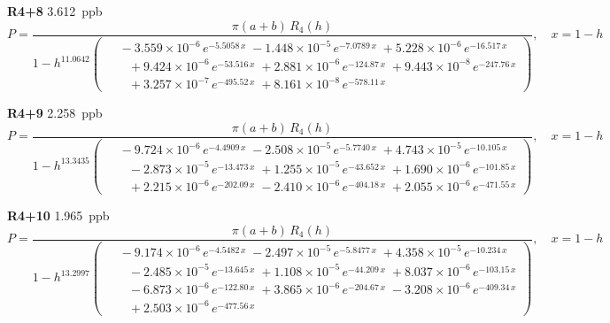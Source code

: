 \documentclass[12pt]{article}
\begin{document}
\noindent\textbf{R4+8} 3.612~ppb\nopagebreak
\begin{equation*}
P = \frac{\pi(a{+}b)\,R_4(h)}{1 - h^{11.0642}\!\left(\!\begin{aligned}
  &\; -3.559{\times}10^{-6}\,e^{-5.5058\,x} \; -1.448{\times}10^{-5}\,e^{-7.0789\,x} \; +5.228{\times}10^{-6}\,e^{-16.517\,x} \\[-3pt]
  &\quad +9.424{\times}10^{-6}\,e^{-53.516\,x} \; +2.881{\times}10^{-6}\,e^{-124.87\,x} \; +9.443{\times}10^{-8}\,e^{-247.76\,x} \\[-3pt]
  &\quad +3.257{\times}10^{-7}\,e^{-495.52\,x} \; +8.161{\times}10^{-8}\,e^{-578.11\,x}
\end{aligned}\!\right)}, \quad x = 1{-}h
\end{equation*}

\noindent\textbf{R4+9} 2.258~ppb\nopagebreak
\begin{equation*}
P = \frac{\pi(a{+}b)\,R_4(h)}{1 - h^{13.3435}\!\left(\!\begin{aligned}
  &\; -9.724{\times}10^{-6}\,e^{-4.4909\,x} \; -2.508{\times}10^{-5}\,e^{-5.7740\,x} \; +4.743{\times}10^{-5}\,e^{-10.105\,x} \\[-3pt]
  &\quad -2.873{\times}10^{-5}\,e^{-13.473\,x} \; +1.255{\times}10^{-5}\,e^{-43.652\,x} \; +1.690{\times}10^{-6}\,e^{-101.85\,x} \\[-3pt]
  &\quad +2.215{\times}10^{-6}\,e^{-202.09\,x} \; -2.410{\times}10^{-6}\,e^{-404.18\,x} \; +2.055{\times}10^{-6}\,e^{-471.55\,x}
\end{aligned}\!\right)}, \quad x = 1{-}h
\end{equation*}

\noindent\textbf{R4+10} 1.965~ppb\nopagebreak
\begin{equation*}
P = \frac{\pi(a{+}b)\,R_4(h)}{1 - h^{13.2997}\!\left(\!\begin{aligned}
  &\; -9.174{\times}10^{-6}\,e^{-4.5482\,x} \; -2.497{\times}10^{-5}\,e^{-5.8477\,x} \; +4.358{\times}10^{-5}\,e^{-10.234\,x} \\[-3pt]
  &\quad -2.485{\times}10^{-5}\,e^{-13.645\,x} \; +1.108{\times}10^{-5}\,e^{-44.209\,x} \; +8.037{\times}10^{-6}\,e^{-103.15\,x} \\[-3pt]
  &\quad -6.873{\times}10^{-6}\,e^{-122.80\,x} \; +3.865{\times}10^{-6}\,e^{-204.67\,x} \; -3.208{\times}10^{-6}\,e^{-409.34\,x} \\[-3pt]
  &\quad +2.503{\times}10^{-6}\,e^{-477.56\,x}
\end{aligned}\!\right)}, \quad x = 1{-}h
\end{equation*}
\end{document}
